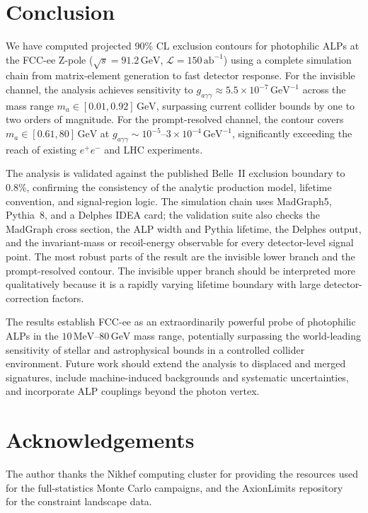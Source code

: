 \documentclass[12pt,a4paper]{article}
\newcommand{\alp}{a}
\newcommand{\gagg}{g_{a\gamma\gamma}}
\newcommand{\Lint}{\mathcal{L}}
\newcommand{\sqrts}{\sqrt{s}}
\newcommand{\MeV}{\,\text{MeV}}
\newcommand{\GeV}{\,\text{GeV}}
\newcommand{\abinv}{\,\text{ab}^{-1}}
\begin{document}
\section{Conclusion}
\label{sec:conclusion}

We have computed projected 90\% CL exclusion contours for photophilic ALPs at
the FCC-ee Z-pole ($\sqrts = 91.2\GeV$, $\Lint = 150\abinv$) using a
complete simulation chain from matrix-element generation to fast detector
response.
For the invisible channel, the analysis achieves sensitivity to
$\gagg \approx 5.5\times10^{-7}\GeV^{-1}$ across the mass range
$m_\alp \in [0.01, 0.92]\GeV$, surpassing current collider bounds by one to
two orders of magnitude.
For the prompt-resolved channel, the contour covers
$m_\alp \in [0.61, 80]\GeV$ at $\gagg \sim 10^{-5}$--$3\times10^{-4}\GeV^{-1}$,
significantly exceeding the reach of existing $e^+e^-$ and LHC experiments.

The analysis is validated against the published Belle~II exclusion boundary
to 0.8\%, confirming the consistency of the analytic production model,
lifetime convention, and signal-region logic.
The simulation chain uses MadGraph5, Pythia~8, and a Delphes IDEA card; the
validation suite also checks the MadGraph cross section, the ALP width and
Pythia lifetime, the Delphes output, and the invariant-mass or recoil-energy
observable for every detector-level signal point.
The most robust parts of the result are the invisible lower branch and the
prompt-resolved contour. The invisible upper branch should be interpreted more
qualitatively because it is a rapidly varying lifetime boundary with large
detector-correction factors.

The results establish FCC-ee as an extraordinarily powerful probe of
photophilic ALPs in the $10\MeV$--$80\GeV$ mass range, potentially
surpassing the world-leading sensitivity of stellar and astrophysical
bounds in a controlled collider environment.
Future work should extend the analysis to displaced and merged signatures,
include machine-induced backgrounds and systematic uncertainties, and
incorporate ALP couplings beyond the photon vertex.

\section*{Acknowledgements}

The author thanks the Nikhef computing cluster for providing the resources
used for the full-statistics Monte Carlo campaigns, and the AxionLimits
repository~\cite{AxionLimits} for the constraint landscape data.
\end{document}
